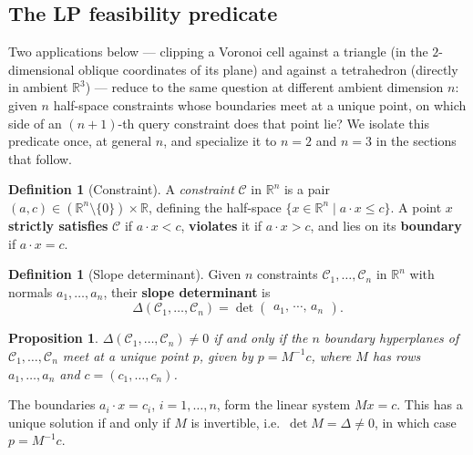 \documentclass[12pt]{article}
\makeatletter
\newtheorem{proposition}[theorem]{Proposition}
\theoremstyle{definition}
\newtheorem{definition}[theorem]{Definition}
\theoremstyle{remark}
\renewenvironment{proof}[1][\proofname]{\par
  \pushQED{\qed}%
  \normalfont \footnotesize \topsep6\p@\@plus6\p@\relax
  \list{}{\leftmargin=2em
          \settowidth{\itemindent}{\itshape#1}%
          \labelwidth=\itemindent
          \parsep=0pt \listparindent=\parindent 
  }
  \item[\hskip\labelsep
        \itshape
    #1\@addpunct{.}]\ignorespaces
}{%
  \popQED\endlist\@endpefalse
}
\makeatother
\begin{document}
\subsection{The LP feasibility predicate}\label{sec:lp-feasible}

Two applications below --- clipping a Voronoi cell against a triangle (in the
$2$-dimensional oblique coordinates of its plane) and against a tetrahedron
(directly in ambient $\mathbb{R}^3$) --- reduce to the same question at
different ambient dimension $n$: given $n$ half-space constraints whose
boundaries meet at a unique point, on which side of an $(n+1)$-th query
constraint does that point lie? We isolate this predicate once, at general
$n$, and specialize it to $n=2$ and $n=3$ in the sections that follow.

\begin{definition}[Constraint]\label{def:constraint}
A \emph{constraint} $\mathcal{C}$ in $\mathbb{R}^n$ is a pair $(a, c)
\in (\mathbb{R}^n\setminus\{0\}) \times \mathbb{R}$, defining the half-space
$\{x \in \mathbb{R}^n \mid a\cdot x \leq c\}$. A point $x$
\textbf{strictly satisfies} $\mathcal C$ if $a \cdot x < c$,
\textbf{violates} it if $a \cdot x > c$, and lies on its
\textbf{boundary} if $a \cdot x = c$.
\end{definition}

\begin{definition}[Slope determinant]\label{def:slope}
Given $n$ constraints $\mathcal C_1, \ldots, \mathcal C_n$ in $\mathbb{R}^n$
with normals $a_1, \ldots, a_n$, their \textbf{slope
determinant} is
\begin{equation*}
    \Delta(\mathcal C_1,\ldots,\mathcal C_n) = \det \begin{pmatrix} a_1,\, \cdots,\, a_n \end{pmatrix}.
\end{equation*}
\end{definition}

\begin{proposition}\label{prop:lp-vertex}
$\Delta(\mathcal C_1,\ldots,\mathcal C_n) \neq 0$ if and only if the $n$
boundary hyperplanes of $\mathcal C_1, \ldots, \mathcal C_n$ meet at a unique
point $p$, given by $p = M^{-1}c$, where $M$ has rows
$a_1,\ldots,a_n$ and $c =
(c_1,\ldots,c_n)$.
\end{proposition}
\begin{proof}
    The boundaries $a_i \cdot x = c_i$, $i=1,\ldots,n$, form the
    linear system $Mx = c$. This has a unique solution if and only if
    $M$ is invertible, i.e.\ $\det M = \Delta \neq 0$, in which case
    $p = M^{-1}c$.
\end{proof}
\end{document}
